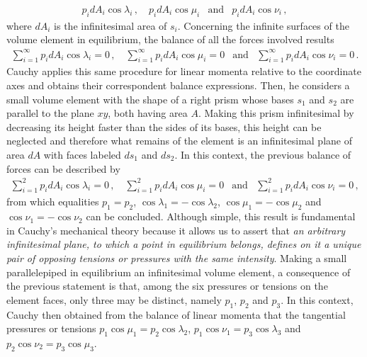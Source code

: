 \begin{eqnarray*}
p_idA_i\cos\lambda_i\,, \quad p_idA_i\cos\mu_i  &\text{and}& p_idA_i\cos\nu_i\,,
\end{eqnarray*}
where $dA_i$ is the infinitesimal area of $s_i$. Concerning the infinite surfaces of the volume element in equilibrium, the balance of all the forces involved results
\begin{eqnarray*}
\sum_{i=1}^\infty p_idA_i\cos\lambda_i=0\,, \quad \sum_{i=1}^\infty p_idA_i\cos\mu_i=0 &\text{and}& \sum_{i=1}^\infty p_idA_i\cos\nu_i=0\,.
\end{eqnarray*}
Cauchy applies this same procedure for linear momenta relative to the coordinate axes and obtains their correspondent balance expressions. Then, he considers a small volume element with the shape of a right prism whose bases $s_1$ and $s_2$ are parallel to the plane $xy$, both having area $A$. Making this prism infinitesimal by decreasing its height faster than the sides of its bases, this height can be neglected and therefore what remains of the element is an infinitesimal plane of area $dA$ with faces labeled $ds_1$ and $ds_2$. In this context, the previous balance of forces can be described by  
\begin{eqnarray*}
\sum_{i=1}^2 p_idA_i\cos\lambda_i=0\,, \quad \sum_{i=1}^2 p_idA_i\cos\mu_i=0 &\text{and}& \sum_{i=1}^2 p_idA_i\cos\nu_i=0\,,
\end{eqnarray*}
from which equalities $p_1=p_2$, $\cos\lambda_1=-\cos\lambda_2$, $\cos\mu_1=-\cos\mu_2$ and  $\cos\nu_1=-\cos\nu_2$ can be concluded. Although simple, this result is fundamental in Cauchy's mechanical theory because it allows us to assert that \emph{an arbitrary infinitesimal  plane, to which a point in equilibrium belongs, defines on it a unique pair of opposing tensions or pressures with the same intensity}. Making a small parallelepiped in equilibrium an infinitesimal volume element, a consequence of the previous statement is that, among the six pressures or tensions on the element faces, only three may be distinct, namely $p_1$, $p_2$ and $p_3$. In this context, Cauchy then obtained from the balance of linear momenta that the tangential pressures or tensions $p_1\cos\mu_1=p_2\cos\lambda_2$, $p_1\cos\nu_1=p_3\cos\lambda_3$ and $p_2\cos\nu_2=p_3\cos\mu_3$. 

